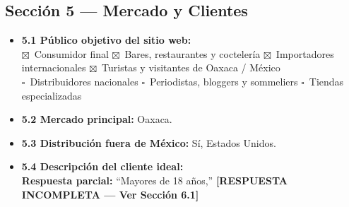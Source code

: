 \documentclass[11pt,letterpaper]{article}
\newcommand{\uchk}{$\square$}
\newcommand{\chk}{\textcolor{mezcalAgave}{$\boxtimes$}}
\begin{document}
\subsection{Sección 5 — Mercado y Clientes}
\begin{itemize}[leftmargin=1.5em]
    \item \textbf{5.1 Público objetivo del sitio web:}\\
    \chk\ Consumidor final \quad
    \chk\ Bares, restaurantes y coctelería \quad
    \chk\ Importadores internacionales \quad
    \chk\ Turistas y visitantes de Oaxaca / México \\
    \uchk\ Distribuidores nacionales \quad
    \uchk\ Periodistas, bloggers y sommeliers \quad
    \uchk\ Tiendas especializadas

    \item \textbf{5.2 Mercado principal:} Oaxaca.
    \item \textbf{5.3 Distribución fuera de México:} Sí, Estados Unidos.
    \item \textbf{5.4 Descripción del cliente ideal:}\\
    \textbf{Respuesta parcial:} ``Mayores de 18 años,'' \textcolor{red!80!black}{\textbf{[RESPUESTA INCOMPLETA — Ver Sección 6.1]}}
\end{itemize}
\end{document}
